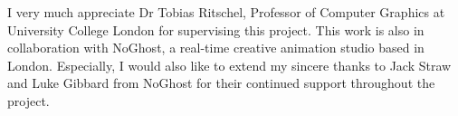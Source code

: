 \begin{acknowledgements}
I very much appreciate Dr Tobias Ritschel, Professor of Computer Graphics at University College London for supervising this project. This work is also in collaboration with NoGhost, a real-time creative animation studio based in London. Especially, I would also like to extend my sincere thanks to Jack Straw and Luke Gibbard from NoGhost for their continued support throughout the project.
\end{acknowledgements}



\setcounter{tocdepth}{2} 

\tableofcontents
\listoffigures
\listoftables

